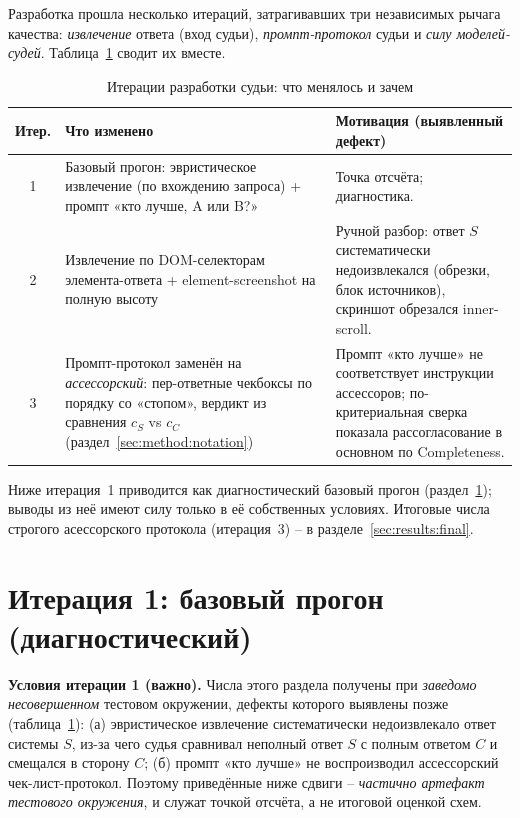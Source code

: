 Разработка прошла несколько итераций, затрагивавших три независимых рычага
качества: \emph{извлечение} ответа (вход судьи), \emph{промпт-протокол}
судьи и \emph{силу моделей-судей}.
Таблица~\ref{tab:iterations} сводит их вместе.

\begin{table}[htbp]
    \centering
    \caption{Итерации разработки судьи: что менялось и зачем}
    \label{tab:iterations}
    \begin{tabular}{clp{6.4cm}}
        \toprule
        Итер. & Что изменено & Мотивация (выявленный дефект) \\
        \midrule
        1 & Базовый прогон: эвристическое
            извлечение (по вхождению запроса) + промпт «кто лучше, A или
            B?» & Точка отсчёта; диагностика. \\
        2 & Извлечение по DOM-селекторам
            элемента-ответа + element-screenshot на полную высоту &
            Ручной разбор: ответ $S$ систематически недоизвлекался
            (обрезки, блок источников), скриншот обрезался inner-scroll. \\
        3 & Промпт-протокол заменён на
            \emph{ассессорский}: пер-ответные чекбоксы по порядку со
            «стопом», вердикт из сравнения $c_S$ vs $c_C$
            (раздел~\ref{sec:method:notation}) & Промпт «кто лучше» не
            соответствует инструкции ассессоров; по-критериальная сверка
            показала рассогласование в основном по Completeness. \\
        \bottomrule
    \end{tabular}
\end{table}

Ниже итерация~1 приводится как диагностический базовый прогон
(раздел~\ref{sec:results:iter1}); выводы из неё имеют силу только в её
собственных условиях. Итоговые числа строгого асессорского протокола (итерация~3) --
в разделе~\ref{sec:results:final}.

\section{Итерация 1: базовый прогон (диагностический)}
\label{sec:results:iter1}

\textbf{Условия итерации 1 (важно).} Числа этого раздела получены при
\emph{заведомо несовершенном} тестовом окружении, дефекты которого выявлены позже
(таблица~\ref{tab:iterations}): (а) эвристическое извлечение
систематически недоизвлекало ответ системы $S$, из-за чего судья сравнивал
неполный ответ $S$ с полным ответом $C$ и смещался в сторону $C$; (б)
промпт «кто лучше» не воспроизводил ассессорский чек-лист-протокол.
Поэтому приведённые ниже сдвиги -- \emph{частично артефакт тестового окружения}, и
служат точкой отсчёта, а не итоговой оценкой схем.

